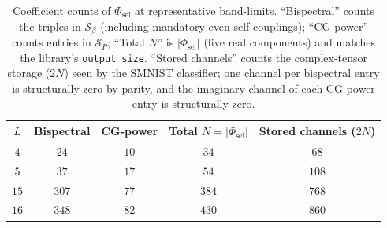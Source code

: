 \documentclass{article}
\theoremstyle{definition}
\theoremstyle{remark}
\theoremstyle{definition}
\begin{document}
\begin{table}[h]
  \caption{Coefficient counts of $\Phi_{\mathrm{sel}}$ at
    representative band-limits. ``Bispectral'' counts the triples in
    $\mathcal{S}_\beta$ (including mandatory even self-couplings);
    ``CG-power'' counts entries in $\mathcal{S}_P$; ``Total $N$'' is
    $|\Phi_{\mathrm{sel}}|$ (live real components) and matches the
    library's \texttt{output\_size}. ``Stored channels'' counts the
    complex-tensor storage ($2N$) seen by the SMNIST classifier;
    one channel per bispectral entry is structurally zero by
    parity, and the imaginary channel of each CG-power entry is
    structurally zero.}
  \label{tab:app-counts}
  \centering
  \small
  \setlength{\tabcolsep}{6pt}
  \begin{tabular}{ccccc}
    \toprule
    $L$ & Bispectral & CG-power & Total $N=|\Phi_{\mathrm{sel}}|$
        & Stored channels ($2N$) \\
    \midrule
    $4$  & $24$  & $10$  & $34$  & $68$  \\
    $5$  & $37$  & $17$  & $54$  & $108$ \\
    $15$ & $307$ & $77$  & $384$ & $768$ \\
    $16$ & $348$ & $82$  & $430$ & $860$ \\
    \bottomrule
  \end{tabular}
\end{table}
\clearpage
\end{document}
